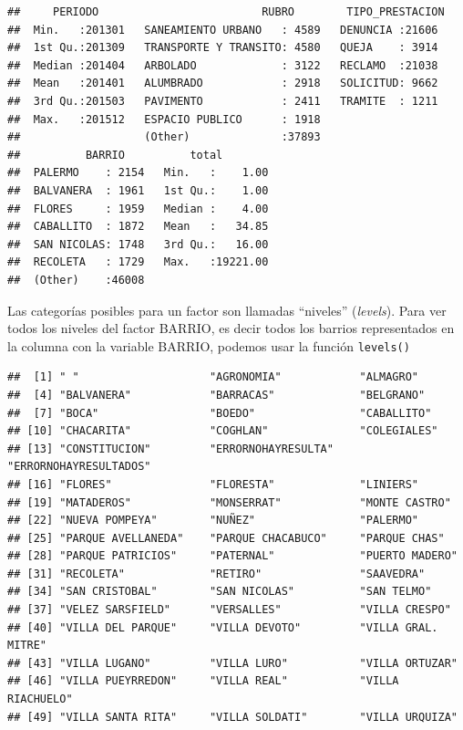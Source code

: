 \documentclass[spanish,]{book}
\newenvironment{Shaded}{\begin{snugshade}}{\end{snugshade}}
\newcommand{\KeywordTok}[1]{\textcolor[rgb]{0.13,0.29,0.53}{\textbf{#1}}}
\newcommand{\NormalTok}[1]{#1}
\newcommand{\OperatorTok}[1]{\textcolor[rgb]{0.81,0.36,0.00}{\textbf{#1}}}
\begin{document}
\begin{verbatim}
##     PERIODO                         RUBRO        TIPO_PRESTACION 
##  Min.   :201301   SANEAMIENTO URBANO   : 4589   DENUNCIA :21606  
##  1st Qu.:201309   TRANSPORTE Y TRANSITO: 4580   QUEJA    : 3914  
##  Median :201404   ARBOLADO             : 3122   RECLAMO  :21038  
##  Mean   :201401   ALUMBRADO            : 2918   SOLICITUD: 9662  
##  3rd Qu.:201503   PAVIMENTO            : 2411   TRAMITE  : 1211  
##  Max.   :201512   ESPACIO PUBLICO      : 1918                    
##                   (Other)              :37893                    
##          BARRIO          total         
##  PALERMO    : 2154   Min.   :    1.00  
##  BALVANERA  : 1961   1st Qu.:    1.00  
##  FLORES     : 1959   Median :    4.00  
##  CABALLITO  : 1872   Mean   :   34.85  
##  SAN NICOLAS: 1748   3rd Qu.:   16.00  
##  RECOLETA   : 1729   Max.   :19221.00  
##  (Other)    :46008
\end{verbatim}

Las categorías posibles para un factor son llamadas ``niveles'' (\emph{levels}). Para ver todos los niveles del factor BARRIO, es decir todos los barrios representados en la columna con la variable BARRIO, podemos usar la función \texttt{levels()}

\begin{Shaded}
\end{Shaded}

\begin{verbatim}
##  [1] " "                    "AGRONOMIA"            "ALMAGRO"             
##  [4] "BALVANERA"            "BARRACAS"             "BELGRANO"            
##  [7] "BOCA"                 "BOEDO"                "CABALLITO"           
## [10] "CHACARITA"            "COGHLAN"              "COLEGIALES"          
## [13] "CONSTITUCION"         "ERRORNOHAYRESULTA"    "ERRORNOHAYRESULTADOS"
## [16] "FLORES"               "FLORESTA"             "LINIERS"             
## [19] "MATADEROS"            "MONSERRAT"            "MONTE CASTRO"        
## [22] "NUEVA POMPEYA"        "NUÑEZ"                "PALERMO"             
## [25] "PARQUE AVELLANEDA"    "PARQUE CHACABUCO"     "PARQUE CHAS"         
## [28] "PARQUE PATRICIOS"     "PATERNAL"             "PUERTO MADERO"       
## [31] "RECOLETA"             "RETIRO"               "SAAVEDRA"            
## [34] "SAN CRISTOBAL"        "SAN NICOLAS"          "SAN TELMO"           
## [37] "VELEZ SARSFIELD"      "VERSALLES"            "VILLA CRESPO"        
## [40] "VILLA DEL PARQUE"     "VILLA DEVOTO"         "VILLA GRAL. MITRE"   
## [43] "VILLA LUGANO"         "VILLA LURO"           "VILLA ORTUZAR"       
## [46] "VILLA PUEYRREDON"     "VILLA REAL"           "VILLA RIACHUELO"     
## [49] "VILLA SANTA RITA"     "VILLA SOLDATI"        "VILLA URQUIZA"
\end{verbatim}
\end{document}

